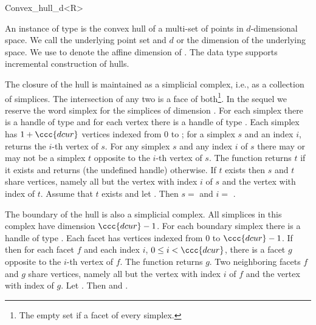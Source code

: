
\begin{ccRefClass}{Convex_hull_d<R>}

\ccDefinition

An instance  of type  is the convex
hull of a multi-set  of points in $d$-dimensional space. We call
 the underlying point set and $d$ or  the dimension of the
underlying space. We use  to denote the affine dimension of .
The data type supports incremental construction of hulls.

The closure of the hull is maintained as a simplicial complex, i.e.,
as a collection of simplices. The intersection of any two is a face of
both\footnote{The empty set if a facet of every simplex.}. In the
sequel we reserve the word simplex for the simplices of dimension
. For each simplex there is a handle of type 
and for each vertex there is a handle of type .  Each
simplex has $1 + \ccc{dcur}$ vertices indexed from $0$ to ; for a
simplex $s$ and an index $i$,  returns the $i$-th
vertex of $s$. For any simplex $s$ and any index $i$ of $s$ there may
or may not be a simplex $t$ opposite to the $i$-th vertex of $s$.  The
function  returns $t$ if it exists and
returns  (the undefined handle) otherwise. If $t$
exists then $s$ and $t$ share  vertices, namely all but the
vertex with index $i$ of $s$ and the vertex with index
 of $t$. Assume that $t$
exists and let .  Then
$s =$  and $i =$
.

The boundary of the hull is also a simplicial complex. All simplices
in this complex have dimension $\ccc{dcur} - 1$.  For each boundary simplex
there is a handle of type .  Each facet has  vertices
indexed from $0$ to $\ccc{dcur} - 1$. If  then for each facet $f$
and each index $i$, $0 \le i < \ccc{dcur}$, there is a facet $g$ opposite
to the $i$-th vertex of $f$.  The function 
returns $g$.  Two neighboring facets $f$ and $g$ share 
vertices, namely all but the vertex with index $i$ of $f$ and the
vertex with index  of $g$.
Let . Then 
 and 
. 




\end{ccRefClass}
